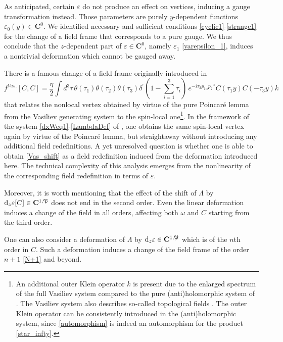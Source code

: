 \documentclass[12pt]{article}
\newcommand{\dr}{{{\rm d}}}
\newcommand{\go}{\omega}
\begin{document}
As anticipated, certain $\varepsilon$ do not produce an effect on vertices, inducing a gauge transformation instead. Those parameters are purely $y$-dependent functions $\varepsilon_0(y)\in\mathbf{C}^0$. We identified necessary and sufficient conditions \eqref{cyclic1}-\eqref{strange1} for the change of a field frame that corresponds to a pure gauge. We thus conclude that the $z$-dependent part of $\varepsilon\in\mathbf{C}^0$, namely $\varepsilon_1$ \eqref{varepsilon_1}, induces a nontrivial deformation which cannot be gauged away.
  
There is a famous change of a field frame originally introduced in \cite{Vasiliev:2016xui}
\begin{equation}\label{Vas_shift}
f^{Vas.}[C,C]=\frac{\eta}{2}\int d^3\tau\, \theta(\tau_1)\theta(\tau_2)\theta(\tau_3)\delta^\prime(1-\sum_{i=1}^3 \tau_i)\, e^{-i\tau_2 p_{1\alpha}p_2 {}^\alpha}C(\tau_1y)C(-\tau_3y)k\,
\end{equation}
that relates the nonlocal vertex obtained by virtue of the pure Poincaré lemma from the Vasiliev generating system to the spin-local one\footnote{An additional outer Klein operator $k$ is present due to the enlarged spectrum of the full Vasiliev system compared to the pure (anti)holomorphic system of \cite{Didenko:2022qga}. The Vasiliev system also describes so‑called topological fields \cite{Kirakosiants:2026spd}. The outer Klein operator can be consistently introduced in the (anti)holomorphic system, since \eqref{automorphism} is indeed an automorphism for the product \eqref{star_infty}.}. In the framework of the system \eqref{dxWeq1}-\eqref{LambdaDef} of \cite{Didenko:2022qga}, one obtains the same spin-local vertex again by virtue of the Poincaré lemma, but straightaway without introducing any additional field redefinitions. A yet unresolved question is whether one is able to obtain \eqref{Vas_shift} as a field redefinition induced from the deformation introduced here. The technical complexity of this analysis emerges from the nonlinearity of the corresponding field redefinition in terms of $\varepsilon$.

Moreover, it is worth mentioning that the effect of the shift of $\Lambda$ by $\dr_z \varepsilon[C]\in\mathbf{C}^{1,\mathfrak{P}}$ does not end in the second order. Even the linear deformation induces a change of the field in all orders, affecting both $\go$ and $C$ starting from the third order.

One can also consider a deformation of $\Lambda$ by $\dr_z\varepsilon\in \mathbf{C}^{1,\mathfrak{P}}$ which is of the $n$th order in 
$C$. Such a deformation induces a change of the field frame of the order 
$n+1$ \eqref{N+1} and beyond.
 
\end{document}
